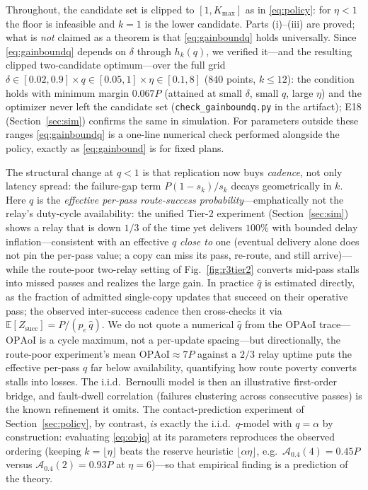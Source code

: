\documentclass[twocolumn,3p,times,procedia]{elsarticle}
\newcommand{\OPAoI}{\mathrm{OPAoI}}
\newcommand{\E}{\mathbb{E}}
\newcommand{\peff}{p_e}
\begin{document}
Throughout, the candidate set is clipped to $[1,K_{\max}]$ as in
\eqref{eq:policy}: for $\eta<1$ the floor is infeasible and $k{=}1$ is
the lower candidate.
Parts (i)--(iii) are proved; what is \emph{not} claimed as a theorem is
that \eqref{eq:gainboundq} holds universally. Since
\eqref{eq:gainboundq} depends on $\delta$ through $h_k(q)$, we verified
it---and the resulting clipped two-candidate optimum---over the full
grid $\delta\in[0.02,0.9]\times q\in[0.05,1]\times\eta\in[0.1,8]$
($840$ points, $k\le12$): the condition holds with minimum margin
$0.067P$ (attained at small $\delta$, small $q$, large $\eta$) and the
optimizer never left the candidate set
(\texttt{check\_gainboundq.py} in the artifact); E18
(Section~\ref{sec:sim}) confirms the same in simulation. For
parameters outside these ranges
\eqref{eq:gainboundq} is a one-line numerical check performed alongside
the policy, exactly as \eqref{eq:gainbound} is for fixed plans.

The structural change at $q<1$ is that replication now buys
\emph{cadence}, not only latency spread: the failure-gap term
$P(1-s_k)/s_k$ decays geometrically in $k$. Here $q$ is the
\emph{effective per-pass route-success probability}---emphatically not
the relay's duty-cycle availability: the unified Tier-2 experiment
(Section~\ref{sec:sim}) shows a relay that is down $1/3$ of the time
yet delivers $100\%$ with bounded delay inflation---consistent with an
effective $q$ \emph{close to} one (eventual delivery alone does not
pin the per-pass value; a copy can miss its pass, re-route, and still
arrive)---while
the route-poor two-relay setting of Fig.~\ref{fig:r3tier2} converts
mid-pass stalls into missed passes and realizes the
large gain. In practice $\hat q$ is estimated directly, as the
fraction of admitted single-copy updates that succeed on their
operative pass; the observed inter-success cadence then cross-checks
it via $\E[Z_{\mathrm{succ}}]=P/(\peff\,\hat q)$. We do not quote a
numerical $\hat q$ from the $\OPAoI$ trace---$\OPAoI$ is a cycle
maximum, not a per-update spacing---but directionally, the route-poor
experiment's mean $\OPAoI\approx7P$ against a $2/3$ relay uptime puts
the effective per-pass $q$ far below availability, quantifying how
route poverty converts stalls into losses. The
i.i.d.\ Bernoulli model is then an illustrative first-order bridge, and
fault-dwell correlation (failures clustering across consecutive
passes) is the known refinement it omits. The contact-prediction
experiment of
Section~\ref{sec:policy}, by contrast, \emph{is} exactly the i.i.d.\
$q$-model with $q=\alpha$ by construction:
evaluating \eqref{eq:objq} at its parameters reproduces the observed
ordering (keeping $k{=}\lfloor\eta\rfloor$ beats the reserve heuristic
$\lfloor\alpha\eta\rfloor$, e.g.\ $\mathcal{A}_{0.4}(4)=0.45P$ versus
$\mathcal{A}_{0.4}(2)=0.93P$ at $\eta{=}6$)---so that empirical
finding is a prediction of the theory.
\end{document}
